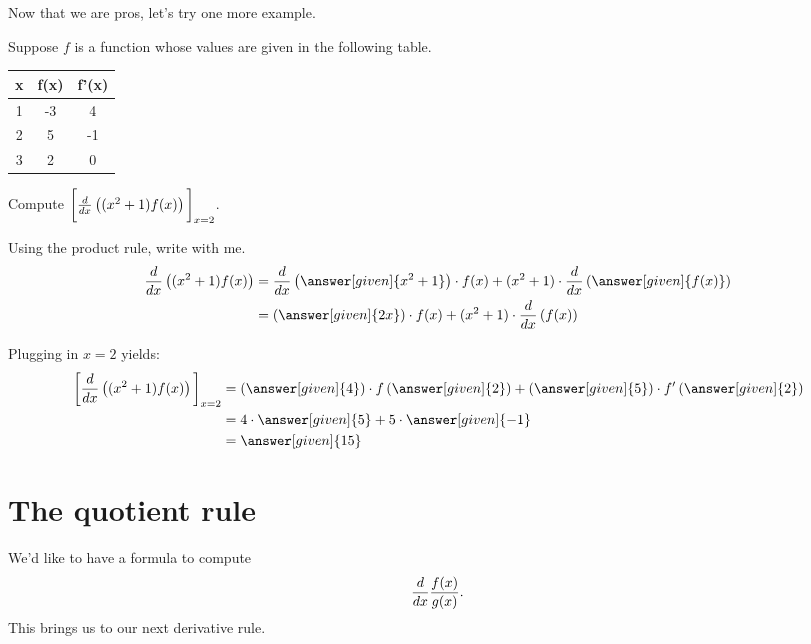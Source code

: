 \documentclass{ximera}
\begin{document}
Now that we are pros, let's try one more example.


\begin{example}
	Suppose $f$ is a function whose values are given in the following table.
	\begin{center}
		\begin{tabular}{c c c}
			\hline \hline
			x & f(x) & f'(x) \\ 
			\hline
			1 & -3 & 4\\
			2 & 5 & -1\\
			3 & 2 & 0\\
			\hline
		\end{tabular}		
	\end{center}
		
	Compute $\bigg[  \frac{d}{\mathop{}\!d x}\left( (x^2+1) f(x) \right) \bigg]_{x=2}$.
	\begin{explanation}
	Using the product rule, write with me.
	\begin{align*}
		\ddx\left( (x^2+1) f(x) \right) &= \ddx \left( \answer[given]{x^2+1} \right) \cdot f(x) + (x^2+1) \cdot \ddx\left( \answer[given]{f(x)} \right) \\
			&= \left( \answer[given]{2x} \right) \cdot f(x) + (x^2+1) \cdot \ddx \left( f(x) \right)
	\end{align*}
	
	Plugging in $x=2$ yields:
	\begin{align*}
		\eval{ \ddx\left( (x^2+1) f(x) \right) }_{x=2} &= \left( \answer[given]{4} \right) \cdot f\left( \answer[given]{2} \right) + \left( \answer[given]{5} \right) \cdot f'\left( \answer[given]{2} \right)\\	
			&= 4 \cdot \answer[given]{5} + 5 \cdot \answer[given]{-1}\\
			&= \answer[given]{15}
	\end{align*}
	\end{explanation}
\end{example}



\section{The quotient rule}


We'd like to have a formula to compute
\[
\frac{d}{\mathop{}\!d x} \frac{f(x)}{g(x)}.
\]
This brings us to our next derivative rule.
\end{document}

